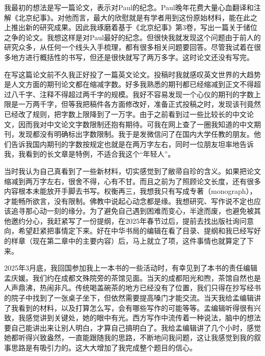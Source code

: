 
我最初的想法是写一篇论文，表示对Paul的纪念。Paul晚年花费大量心血翻译和注解《北京纪事》。对他而言，最大的欣慰就是有学者用到这份原始材料，能在此之上推出新的研究成果。因此我琢磨着基于《北京纪事》第3卷，写出一篇关于储位之争的论文。我想这样是对Paul最好的纪念。但很快我就发现这个问题由于前人的研究众多，从任何一个线头入手梳理，都有很多相关问题要回答。尽管我试着在很多地方进行概括性的书写，但还是很快就写了两万多字。这时论文还没有写完。



在写这篇论文前不久我正好投了一篇英文论文。投稿时我就感叹英文世界的大趋势是人文方面的期刊论文都在缩减字数。好多我熟悉的期刊都已经缩减到正文不得超过八千字、注释不得超过两千字的规模。我好不容易发现一个心仪的期刊的字数上限是一万两千字，但等我把稿件各方面修改好，准备正式投稿之时，发现该刊竟然已经改了规则，把字数上限降到了一万字。由于之前看到过一些比较长的中文论文，因而我对中文论文字数限制还抱有期待。可我在网上查了一圈我知道的中文期刊，发现都没有明确标出字数限制。我于是发微信问了在国内大学任教的朋友。他们告诉我国内期刊的字数按规定也就是在两万字左右，同时一位朋友坦率地告诉我，我看到的长文章是特例，不适合我这个“年轻人”。



当时我认为自己真看到了一些新材料，切实感觉到了敝帚自珍的含义。如果把论文缩减到两万字左右，很舍不得，心有不甘。而且之前为了照顾论文长度，还有很多内容根本未能放开手脚去书写。权衡再三，我想我只有写成专著（monograph），才能畅所欲言，没有限制。佛教中说起心动念都是缘。我想研究、写作说不定也应该追寻那心动一刻的缘分。为了避免自己遇到困难而变心，半途而废，也避免被其他邀约分心，我赶紧写了一份提纲，在2025年春节过后，提前去找出版社询问意向，希望赶紧把事情定下来。好在中华书局的编辑在看了目录、提纲和我已经写好的样章（现在第二章中的主要内容）后，马上就立了项，这件事情也就算定了下来。



2025年3月底，我回国参加我上一本书的一些活动时，有幸见到了本书的责任编辑孟庆媛。我们约在成都文殊院旁的茶馆见面。当天的成都阳光和煦，茶馆自然也是人声鼎沸，热闹非凡。传统喝盖碗茶的地方已经没有了位置，我们只得在抄写经书的院子中找到了一张桌子坐下，但依然需要提高嗓门才能交流。当天我给孟编辑讲了我看到的材料，以及打算怎么写，会有哪些写作的可能等等。孟编辑听得很有兴致，我感觉讲到关键处，她的眼中有光。西方写作中流传着一种说法，脑中的想法要自己能讲出来让别人明白，才算自己搞明白了。我给孟编辑讲了几个小时，感觉她都听得兴致盎然，一直能跟随我的思路，不断地问我问题，这让我感觉到我的叙事思路是有吸引力的。这大大增加了我完成整个题目的信心。


